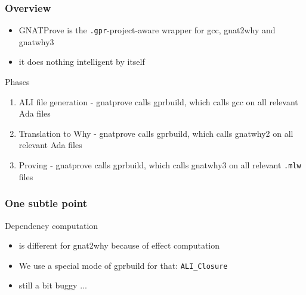 \documentclass{beamer}
\newenvironment{specialframe}{%
  \begin{frame}[fragile,environment=specialframe]}{\end{frame}}
\begin{document}
\begin{specialframe}\frametitle{Overview}
   \begin{itemize}
      \item GNATProve is the \verb|.gpr|-project-aware wrapper for gcc, gnat2why and
      gnatwhy3
      \item it does nothing intelligent by itself
   \end{itemize}

   \begin{block}{Phases}
      \begin{enumerate}
         \item ALI file generation - gnatprove calls gprbuild, which calls gcc
         on all relevant Ada files
         \item Translation to Why - gnatprove calls gprbuild, which calls
         gnatwhy2 on all relevant Ada files
         \item Proving - gnatprove calls gprbuild, which calls gnatwhy3 on all
         relevant \verb|.mlw| files
      \end{enumerate}
   \end{block}
\end{specialframe}

\begin{specialframe}\frametitle{One subtle point}
   \begin{block}{Dependency computation}
      \begin{itemize}
         \item is different for gnat2why because of effect computation
         \item We use a special mode of gprbuild for that: \verb|ALI_Closure|
         \item still a bit buggy ...
      \end{itemize}
   \end{block}
\end{specialframe}
\end{document}
